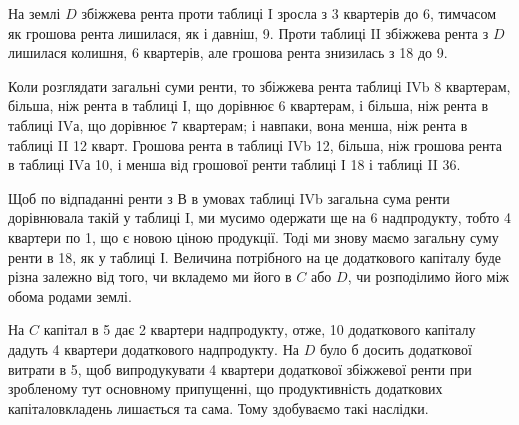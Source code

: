 
На землі $D$ збіжжева рента проти таблиці I зросла з 3
квартерів до 6,
тимчасом як грошова рента лишилася, як і давніш, 9. Проти таблиці II
збіжжева рента з $D$ лишилася колишня, 6 квартерів, але грошова рента знизилась
з 18 до 9.

Коли розглядати загальні суми ренти, то збіжжева рента таблиці IVb \deq{} 8
квартерам, більша, ніж рента в таблиці І, що дорівнює 6 квартерам, і більша,
ніж рента в таблиці IVа, що дорівнює 7 квартерам; і навпаки, вона менша, ніж
рента в таблиці II \deq{} 12 кварт. Грошова рента в таблиці IVb \deq{} 12,
більша, ніж грошова рента в таблиці ІVа \deq{} 10, і менша від грошової
ренти таблиці І \deq{} 18 і таблиці II \deq{} 36.

Щоб по відпаданні ренти з $В$ в умовах таблиці IVb загальна сума ренти
дорівнювала такій у таблиці I, ми мусимо одержати ще на 6
надпродукту, тобто 4 квартери по 1, що є новою ціною продукції.
Тоді ми знову маємо загальну суму ренти в 18, як у таблиці І. Величина
потрібного на це додаткового капіталу буде різна залежно від того, чи
вкладемо ми його в $C$ або $D$, чи розподілимо його між обома родами землі.

На $C$ капітал в 5 дає 2 квартери надпродукту, отже, 10
додаткового капіталу дадуть 4 квартери додаткового надпродукту. На $D$ було б
досить додаткової витрати в 5, щоб випродукувати 4 квартери додаткової
збіжжевої ренти при зробленому тут основному припущенні, що продуктивність
додаткових капіталовкладень лишається та сама. Тому здобуваємо
такі наслідки.

